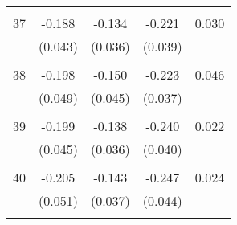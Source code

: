 \begin{tabular}{l*{1}{cccc}}
 & & & &\\
  37       & -0.188 & -0.134 & -0.221 & 0.030 \\
          & (0.043) & (0.036) & (0.039) & \\
 & & & &\\
  38       & -0.198 & -0.150 & -0.223 & 0.046 \\
          & (0.049) & (0.045) & (0.037) & \\
 & & & &\\
  39       & -0.199 & -0.138 & -0.240 & 0.022 \\
          & (0.045) & (0.036) & (0.040) & \\
 & & & &\\
  40       & -0.205 & -0.143 & -0.247 & 0.024 \\
          & (0.051) & (0.037) & (0.044) & \\
 & & & &\\
\hline\hline
\end{tabular}
